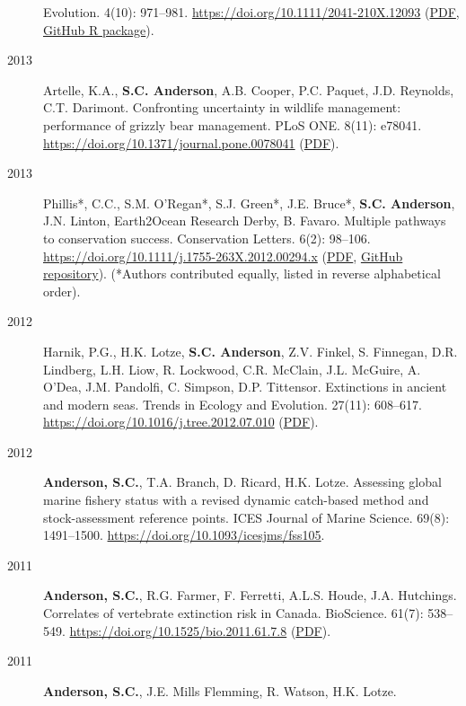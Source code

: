 \begin{description}
Evolution. 4(10): 971--981.
\url{https://doi.org/10.1111/2041-210X.12093}
(\href{https://www.dropbox.com/s/7tx1h1pkmmp222j/Anderson_etal_2013_ecological_prophets_with_SOM.pdf?dl=1}{PDF},
\href{https://github.com/seananderson/ecofolio}{GitHub R package}).
\item[2013]
Artelle, K.A., \textbf{S.C. Anderson}, A.B. Cooper, P.C. Paquet, J.D.
Reynolds, C.T. Darimont. Confronting uncertainty in wildlife management:
performance of grizzly bear management. PLoS ONE. 8(11): e78041.
\url{https://doi.org/10.1371/journal.pone.0078041}
(\href{http://www.plosone.org/article/fetchObject.action?uri=info\%3Adoi\%2F10.1371\%2Fjournal.pone.0078041\&representation=PDF}{PDF}).
\item[2013]
Phillis*, C.C., S.M. O'Regan*, S.J. Green*, J.E. Bruce*, \textbf{S.C.
Anderson}, J.N. Linton, Earth2Ocean Research Derby, B. Favaro. Multiple
pathways to conservation success. Conservation Letters. 6(2): 98--106.
\url{https://doi.org/10.1111/j.1755-263X.2012.00294.x}
(\href{https://www.dropbox.com/s/cxt848ng5x4hc4t/Phillis_etal_2012_Multiple_pathways_to_conservation_success.pdf?dl=1}{PDF},
\href{https://github.com/seananderson/conservation_pathways}{GitHub
repository}). (*Authors contributed equally, listed in reverse
alphabetical order).
\item[2012]
Harnik, P.G., H.K. Lotze, \textbf{S.C. Anderson}, Z.V. Finkel, S.
Finnegan, D.R. Lindberg, L.H. Liow, R. Lockwood, C.R. McClain, J.L.
McGuire, A. O'Dea, J.M. Pandolfi, C. Simpson, D.P. Tittensor.
Extinctions in ancient and modern seas. Trends in Ecology and Evolution.
27(11): 608--617. \url{https://doi.org/10.1016/j.tree.2012.07.010}
(\href{https://www.dropbox.com/s/rdn9685viqr37qy/Harnik_etal_2012_Extinctions_in_ancient_and_modern_seas.pdf?dl=1}{PDF}).
\item[2012]
\textbf{Anderson, S.C.}, T.A. Branch, D. Ricard, H.K. Lotze. Assessing
global marine fishery status with a revised dynamic catch-based method
and stock-assessment reference points. ICES Journal of Marine Science.
69(8): 1491--1500. \url{https://doi.org/10.1093/icesjms/fss105}.
\item[2011]
\textbf{Anderson, S.C.}, R.G. Farmer, F. Ferretti, A.L.S. Houde, J.A.
Hutchings. Correlates of vertebrate extinction risk in Canada.
BioScience. 61(7): 538--549.
\url{https://doi.org/10.1525/bio.2011.61.7.8}
(\href{https://www.dropbox.com/s/bt16dvi3idw3gdx/Anderson_etal_2011_BioScience_with_supplement.pdf?dl=1}{PDF}).
\item[2011]
\textbf{Anderson, S.C.}, J.E. Mills Flemming, R. Watson, H.K. Lotze.

\end{description}

